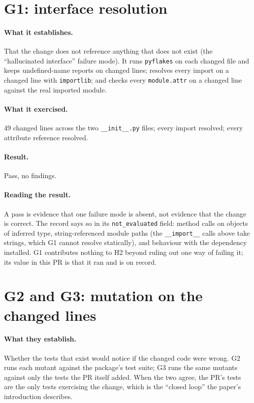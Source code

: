 \documentclass[11pt,a4paper]{article}
\newcommand{\code}[1]{\texttt{#1}}
\begin{document}
\section{G1: interface resolution}
\paragraph{What it establishes.} That the change does not reference anything that does not exist (the ``hallucinated interface'' failure mode). It runs \code{pyflakes} on each changed file and keeps undefined-name reports on changed lines; resolves every import on a changed line with \code{importlib}; and checks every \code{module.attr} on a changed line against the real imported module.

\paragraph{What it exercised.} 49 changed lines across the two \code{\_\_init\_\_.py} files; every import resolved; every attribute reference resolved.

\paragraph{Result.} Pass, no findings.

\paragraph{Reading the result.} A pass is evidence that one failure mode is absent, not evidence that the change is correct. The record says so in its \code{not\_evaluated} field: method calls on objects of inferred type, string-referenced module paths (the \code{\_\_import\_\_} calls above take strings, which G1 cannot resolve statically), and behaviour with the dependency installed. G1 contributes nothing to H2 beyond ruling out one way of failing it; its value in this PR is that it ran and is on record.

\section{G2 and G3: mutation on the changed lines}
\paragraph{What they establish.} Whether the tests that exist would notice if the changed code were wrong. G2 runs each mutant against the package's test suite; G3 runs the same mutants against only the tests the PR itself added. When the two agree, the PR's tests are the only tests exercising the change, which is the ``closed loop'' the paper's introduction describes.
\end{document}
